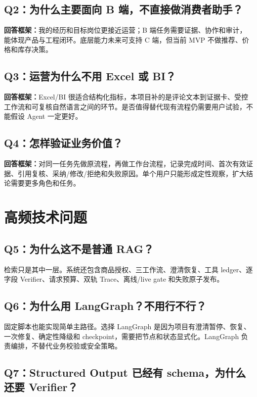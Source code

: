 \subsection{Q2：为什么主要面向 B 端，不直接做消费者助手？}

\textbf{回答框架：}我的经历和目标岗位更接近运营；B 端任务需要证据、协作和审计，能体现产品与工程闭环。底层能力未来可支持 C 端，但当前 MVP 不做推荐、价格和库存决策。

\subsection{Q3：运营为什么不用 Excel 或 BI？}

\textbf{回答框架：}Excel/BI 很适合结构化指标，本项目补的是评论文本到证据卡、受控工作流和可复核自然语言之间的环节。是否值得替代现有流程仍需要用户试验，不能假设 Agent 一定更好。

\subsection{Q4：怎样验证业务价值？}

\textbf{回答框架：}对同一任务先做原流程，再做工作台流程，记录完成时间、首次有效证据、引用复核、采纳/修改/拒绝和失败原因。单个用户只能形成定性观察，扩大结论需要更多角色和任务。

\section{高频技术问题}

\subsection{Q5：为什么这不是普通 RAG？}

检索只是其中一层。系统还包含商品授权、三工作流、澄清恢复、工具 ledger、逐字段 Verifier、请求预算、双轨 Trace、离线/live gate 和失败原子发布。

\subsection{Q6：为什么用 LangGraph？不用行不行？}

固定脚本也能实现简单主路径。选择 LangGraph 是因为项目有澄清暂停、恢复、一次修复、确定性降级和 checkpoint，需要把节点和状态显式化。LangGraph 负责编排，不替代业务校验或安全策略。

\subsection{Q7：Structured Output 已经有 schema，为什么还要 Verifier？}

